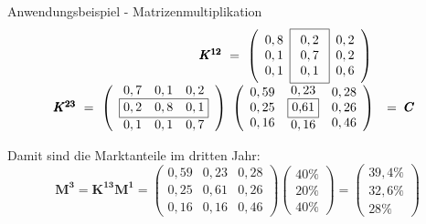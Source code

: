 \begin{frame}{Anwendungsbeispiel - Matrizenmultiplikation}
		\begin{equation*}
		\begin{array}{@{}rl}
		\pmb{K^{12}} \ = \
		\left(
		\begin{array}{c} 0,8 \\ 0,1 \\ 0,1
		\end{array}
		\fbox{$\begin{array}{c} 0,2 \\  0,7 \\ 0,1 \end{array}$}
		\begin{array}{c} 0,2 \\ 0,2 \\ 0,6
		\end{array}
		\right) \, &
		\\
		\pmb{K^{23}} \ = \
		\left(
		\begin{array}{c}
		0,7 \quad 0,1 \quad 0,2 \\
		\fbox{$0,2 \quad 0,8 \quad 0,1$} \\
		0,1 \quad 0,1 \quad 0,7
		\end{array} \right) \
		\left(
		\begin{array}{c} 0,59 \\ 0,25 \\ 0,16 \end{array}
	\begin{array}{c} 0,23 \\ \fbox{0,61} \\ 0,16
		\end{array}
	\begin{array}{c} 0,28 \\ 0,26 \\ 0,46 \end{array}
		\right) &  = \ \pmb{C}
		\end{array}
		\end{equation*}
		
		Damit sind die Marktanteile im dritten Jahr:
		\[
			\pmb{M^{3}} = \pmb{K^{13}} \pmb{M^{1}} = \begin{pmatrix}
				0,59 & 0,23 & 0,28 \\
				0,25 & 0,61 & 0,26 \\
				0,16 & 0,16 & 0,46
			\end{pmatrix} \begin{pmatrix}
				40 \% \\ 20 \% \\ 40 \%
			\end{pmatrix} = \begin{pmatrix}
				39,4 \% \\ 32,6 \% \\ 28 \%
			\end{pmatrix}
		\]
		
\end{frame}

